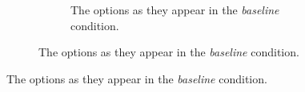 
\begin{figure}[th]
\begin{subfigure}{0.5\columnwidth}
		\begin{subfigure}{\columnwidth}
				\centering
	    \caption {The options as they appear in the \emph{baseline} condition. \label{fig:baseline-choices}}
	    \end{subfigure}


\end{subfigure}
\end{figure}
